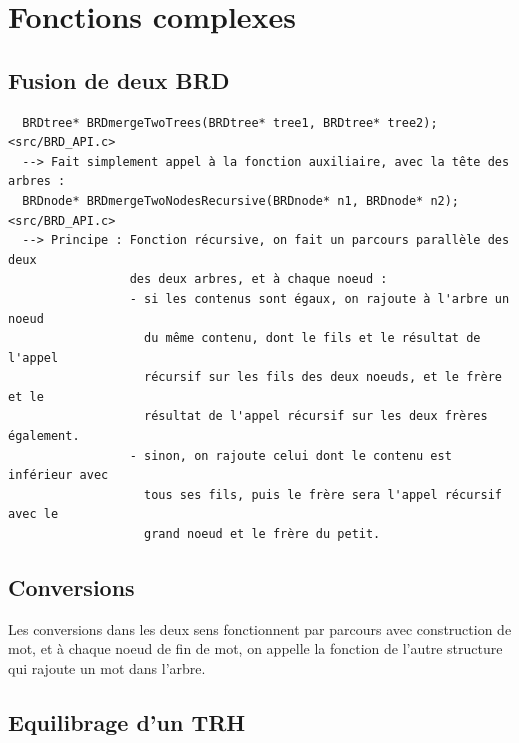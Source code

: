 \documentclass[a4paper,8pt]{report}
\begin{document}
\chapter{Fonctions complexes}

\section*{Fusion de deux BRD}\label{sec:name}

\begin{verbatim}
  BRDtree* BRDmergeTwoTrees(BRDtree* tree1, BRDtree* tree2); <src/BRD_API.c>
  --> Fait simplement appel à la fonction auxiliaire, avec la tête des arbres :
  BRDnode* BRDmergeTwoNodesRecursive(BRDnode* n1, BRDnode* n2); <src/BRD_API.c>
  --> Principe : Fonction récursive, on fait un parcours parallèle des deux
                 des deux arbres, et à chaque noeud :
                 - si les contenus sont égaux, on rajoute à l'arbre un noeud
                   du même contenu, dont le fils et le résultat de l'appel 
                   récursif sur les fils des deux noeuds, et le frère et le
                   résultat de l'appel récursif sur les deux frères également.
                 - sinon, on rajoute celui dont le contenu est inférieur avec 
                   tous ses fils, puis le frère sera l'appel récursif avec le
                   grand noeud et le frère du petit.
\end{verbatim}

\section*{Conversions}\label{sec:name}

Les conversions dans les deux sens fonctionnent par parcours avec construction de mot, et à chaque noeud de fin de mot, on appelle la fonction de l'autre structure qui rajoute un mot dans l'arbre.

\section*{Equilibrage d'un TRH}\label{sec:name}
\end{document}
